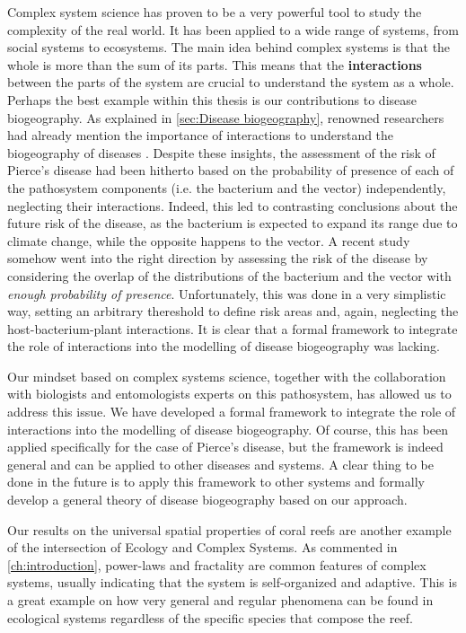 Complex system science has proven to be a very powerful tool to study the
complexity of the real world. It has been applied to a wide range of systems,
from social systems to ecosystems. The main idea behind complex systems is that
the whole is more than the sum of its parts. This means that the
\textbf{interactions} between the parts of the system are crucial to understand
the system as a whole. Perhaps the best example within this thesis is our
contributions to disease biogeography. As explained in \cref{sec:Disease
    biogeography}, renowned researchers had already mention the importance of
interactions to understand the biogeography of diseases \cite{Peterson2008}.
Despite these insights, the assessment of the risk of Pierce's disease had been
hitherto based on the probability of presence of each of the pathosystem
components (i.e. the bacterium and the vector) independently, neglecting their
interactions. Indeed, this led to contrasting conclusions about the future risk
of the disease, as the bacterium is expected to expand its range due to climate
change, while the opposite happens to the vector. A recent study somehow went
into the right direction by assessing the risk of the disease by considering
the overlap of the distributions of the bacterium and the vector with
\textit{enough probability of presence}. Unfortunately, this was done in a very
simplistic way, setting an arbitrary thereshold to define risk areas and,
again, neglecting the host-bacterium-plant interactions. It is clear that a
formal framework to integrate the role of interactions into the modelling of
disease biogeography was lacking.

Our mindset based on complex systems science, together with the collaboration
with biologists and entomologists experts on this pathosystem, has allowed us
to address this issue. We have developed a formal framework to integrate the
role of interactions into the modelling of disease biogeography. Of course,
this has been applied specifically for the case of Pierce's disease, but the
framework is indeed general and can be applied to other diseases and systems.
A clear thing to be done in the future is to apply this framework to other
systems and formally develop a general theory of disease biogeography based on
our approach.

Our results on the universal spatial properties of coral reefs are another
example of the intersection of Ecology and Complex Systems. As commented in
\cref{ch:introduction}, power-laws and fractality are common features of
complex systems, usually indicating that the system is self-organized and
adaptive. This is a great example on how very general and regular phenomena can
be found in ecological systems regardless of the specific species that compose
the reef.

